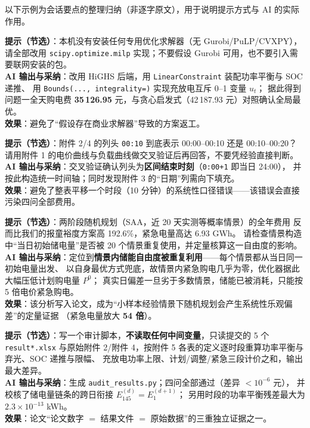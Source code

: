 \documentclass[11pt,a4paper,fontset=fandol]{ctexart}
\begin{document}
以下示例为会话要点的整理归纳（非逐字原文），用于说明提示方式与 AI 的实际作用。

\begin{promptbox}
\textbf{提示（节选）}：本机没有安装任何专用优化求解器（无 Gurobi/PuLP/CVXPY），
请全部改用 \texttt{scipy.optimize.milp} 实现；不要假设 Gurobi 可用，也不要引入需要联网安装的包。\\[3pt]
\textbf{AI 输出与采纳}：改用 HiGHS 后端，用 \texttt{LinearConstraint} 装配功率平衡与 SOC 递推、
用 \texttt{Bounds(..., integrality=)} 实现充放电互斥 0--1 变量 $u_t$；
据此得到问题一全天购电费 \textbf{35\,126.95} 元，与贪心启发式（42\,187.93 元）对照确认全局最优。\\[3pt]
\textbf{效果}：避免了“假设存在商业求解器”导致的方案返工。
\end{promptbox}

\begin{promptbox}
\textbf{提示（节选）}：附件 2/4 的列头 \texttt{00:10} 到底表示 00:00--00:10 还是 00:10--00:20？
请用附件 1 的电价曲线与负载曲线做交叉验证后再回答，不要凭经验直接判断。\\[3pt]
\textbf{AI 输出与采纳}：交叉验证确认列头为\textbf{区间结束时刻}（\texttt{0:00+1} 即当日 24:00），
并按此构造统一时间轴；同时发现附件 3 的“日期”列需向下填充。\\[3pt]
\textbf{效果}：避免了整表平移一个时段（10 分钟）的系统性口径错误——该错误会直接污染四问全部费用。
\end{promptbox}

\begin{promptbox}
\textbf{提示（节选）}：两阶段随机规划（SAA，近 20 天实测等概率情景）的全年费用
反而比我们的报童裕度方案高 192.6\%，紧急电量高达 6.93 GWh。
请检查情景构造中“当日初始储电量”是否被 20 个情景重复使用，并定量核算这一自由度的影响。\\[3pt]
\textbf{AI 输出与采纳}：定位到\textbf{情景内储能自由度被重复利用}——每个情景都从当日同一初始电量出发、
以自身最优方式兜底，故情景内紧急购电几乎为零，优化器据此大幅压低计划购电量 $P^0$；
真实日偏差一旦劣于多数情景，储能已被消耗，只能按 5 倍电价紧急购电。\\[3pt]
\textbf{效果}：该分析写入论文，成为“小样本经验情景下随机规划会产生系统性乐观偏差”的定量证据
（紧急电量放大 \textbf{54 倍}）。
\end{promptbox}

\begin{promptbox}
\textbf{提示（节选）}：写一个审计脚本，\textbf{不读取任何中间变量}，只读提交的 5 个 \texttt{result*.xlsx}
与原始附件 2/附件 4，按附件 5 各表的定义逐时段重算功率平衡与弃光、SOC 递推与限幅、
充放电功率上限、计划/调整/紧急三段计价之和，输出最大差异。\\[3pt]
\textbf{AI 输出与采纳}：生成 \texttt{audit\_results.py}；四问全部通过（差异 $<10^{-6}$ 元），
并校核了储电量链条的跨日衔接 $E_{145}^{(d)}=E_{1}^{(d+1)}$；
另用时段的功率平衡残差最大为 $2.3\times10^{-13}$ kWh。\\[3pt]
\textbf{效果}：论文“论文数字 $=$ 结果文件 $=$ 原始数据”的三重独立证据之一。
\end{promptbox}
\end{document}
